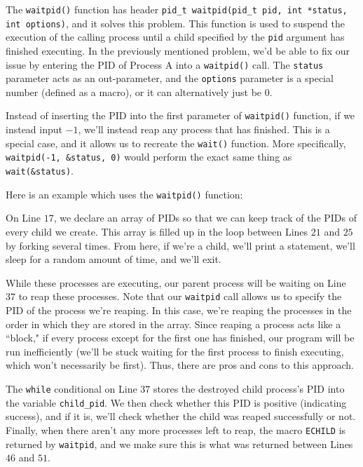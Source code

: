 The \verb!waitpid()! function has header \verb!pid_t waitpid(pid_t pid, int *status, int options)!, and it solves this problem. This function is used to suspend the execution of the calling process until a child specified by the \verb!pid! argument has finished executing. In the previously mentioned problem, we'd be able to fix our issue by entering the PID of Process A into a \verb!waitpid()! call. The \verb!status! parameter acts as an out-parameter, and the \verb!options! parameter is a special number (defined as a macro), or it can alternatively just be $0$.


Instead of inserting the PID into the first parameter of \verb!waitpid()! function, if we instead input $-1$, we'll instead reap any process that has finished. This is a special case, and it allows us to recreate the \verb!wait()! function. More specifically, \verb!waitpid(-1, &status, 0)! would perform the exact same thing as \verb!wait(&status)!. 

Here is an example which uses the \verb!waitpid()! function:

\lstset{caption=Deterministic Reaping}
\begin{center}

\end{center}


On Line $17$, we declare an array of PIDs so that we can keep track of the PIDs of every child we create. This array is filled up in the loop between Lines $21$ and $25$ by forking several times. From here, if we're a child, we'll print a statement, we'll sleep for a random amount of time, and we'll exit. 

While these processes are executing, our parent process will be waiting on Line $37$ to reap these processes. Note that our \verb!waitpid! call allows us to specify the PID of the process we're reaping. In this case, we're reaping the processes in the order in which they are stored in the array. Since reaping a process acts like a ``block," if every process except for the first one has finished, our program will be run inefficiently (we'll be stuck waiting for the first process to finish executing, which won't necessarily be first). Thus, there are pros and cons to this approach.

The \verb!while! conditional on Line $37$ stores the destroyed child process's PID into the variable \verb!child_pid!. We then check whether this PID is positive (indicating success), and if it is, we'll check whether the child was reaped successfully or not. Finally, when there aren't any more processes left to reap, the macro \verb!ECHILD! is returned by \verb!waitpid!, and we make sure this is what was returned between Lines $46$ and $51$. 

